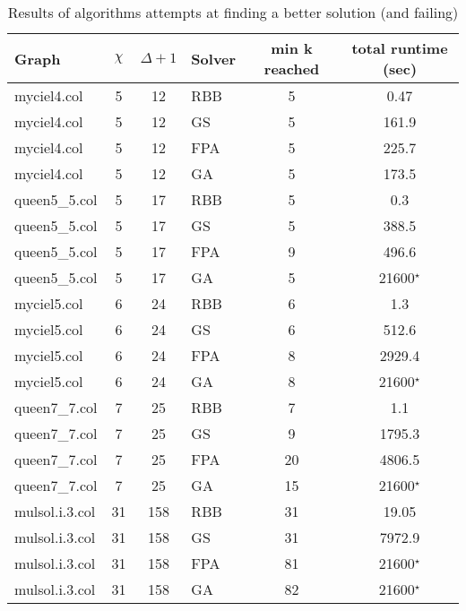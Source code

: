 \begin{table}[H]
\label{results2}
\centering
\begin{tabular}{|l c c l c c|}
\hline
Graph & $\chi$ & $\Delta + 1$ & Solver & min k reached & total runtime (sec) \\\hline

myciel4.col    & 5  & 12  & RBB & 5 & 0.47\\
myciel4.col    & 5  & 12  & GS  & 5 & 161.9\\
myciel4.col    & 5  & 12  & FPA & 5 & 225.7\\
myciel4.col    & 5  & 12  & GA  & 5 & 173.5\\ \hline

queen5\_5.col  & 5  & 17  & RBB & 5 & 0.3\\
queen5\_5.col  & 5  & 17  & GS  & 5 & 388.5\\
queen5\_5.col  & 5  & 17  & FPA & 9 & 496.6\\
queen5\_5.col  & 5  & 17  & GA  & 5 & 21600$^\star$\\ \hline

myciel5.col    & 6  & 24  & RBB & 6 & 1.3\\
myciel5.col    & 6  & 24  & GS  & 6 & 512.6\\
myciel5.col    & 6  & 24  & FPA & 8 & 2929.4\\
myciel5.col    & 6  & 24  & GA  & 8 & 21600$^\star$\\ \hline

queen7\_7.col  & 7  & 25  & RBB & 7 & 1.1\\
queen7\_7.col  & 7  & 25  & GS  & 9 & 1795.3\\
queen7\_7.col  & 7  & 25  & FPA & 20 & 4806.5\\
queen7\_7.col  & 7  & 25  & GA  & 15 & 21600$^\star$\\ \hline

mulsol.i.3.col & 31 & 158 & RBB & 31 & 19.05\\
mulsol.i.3.col & 31 & 158 & GS  & 31 & 7972.9\\
mulsol.i.3.col & 31 & 158 & FPA & 81 & 21600$^\star$\\
mulsol.i.3.col & 31 & 158 & GA  & 82 & 21600$^\star$\\ \hline
\end{tabular}
\caption{Results of algorithms attempts at finding a better solution (and failing)}
\label{res:timeToFail}
\end{table}

